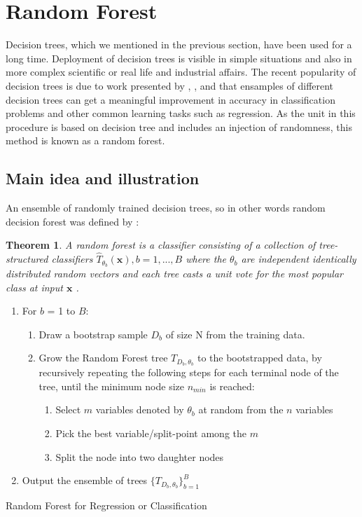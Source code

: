 \section{Random Forest}
Decision trees, which we mentioned in the previous section, have been used for a long time. 
Deployment of decision trees is visible in simple situations and also in more complex scientific or real life and industrial affairs.
The recent popularity of decision trees is due to work presented by 
\cite{Breiman1996OUT-OF-BAG-E}, \cite{breiman2001random}, and \cite{breiman2004consistency} that ensamples of 
different decision trees can get a meaningful improvement in accuracy in classification problems and other 
common learning tasks such as regression. As the unit in this procedure is based on decision tree and includes an injection of
randomness, this method is known as a random forest. 

\subsection{Main idea and illustration}
An ensemble of randomly trained decision trees, so in other words random decision forest was defined by \cite{breiman2001random}:


\newtheorem{theorem}{Theorem}
\begin{theorem}
	A random forest is a classifier consisting of a collection of tree-structured classifiers ${\hat{T}_{\theta_{b}}(\textbf{x})}, b = 1,...,B$ where the $\theta_{b}$ are independent identically
	distributed random vectors and each tree casts a unit vote for the most popular class at input $\textbf{x}$ .
\end{theorem}

\begin{algorithm}[H]
\SetAlgoLined
\begin{enumerate}
	\item For $b$ = 1 to $B$:
	\begin{enumerate}
	    \item Draw a bootstrap sample $D_{b}$ of size N from the training data.
	    \item Grow the Random Forest tree ${{T}_{D_{b},\theta_{b}}}$ to the bootstrapped data, by recursively repeating the following steps for each terminal node of the tree, until the minimum node size $n_{min}$ is reached:
	    \begin{enumerate}
	       \item Select $m$ variables denoted by $\theta_{b}$ at random from the $n$ variables
	       \item Pick the best variable/split-point among the $m$
	       \item  Split the node into two daughter nodes
	    \end{enumerate}
	\end{enumerate}
	\item  Output the ensemble of trees $\{{T}_{D_{b},\theta_{b}}\}_{b=1}^{B}$
\end{enumerate}
 \caption{Random Forest for Regression or Classification \cite{friedman2001elements}}
\end{algorithm}

